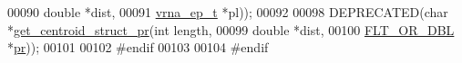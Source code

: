 \begin{DoxyCode}
00090                               \textcolor{keywordtype}{double} *dist,
00091                               \hyperlink{group__struct__utils_structvrna__elem__prob__s}{vrna\_ep\_t} *pl));
00092 
00098 DEPRECATED(\textcolor{keywordtype}{char}  *\hyperlink{centroid_8h_ac92486ce514677256f4a832dc518759c}{get\_centroid\_struct\_pr}(\textcolor{keywordtype}{int} length,
00099                               \textcolor{keywordtype}{double} *dist,
00100                               \hyperlink{group__data__structures_ga31125aeace516926bf7f251f759b6126}{FLT\_OR\_DBL} *\hyperlink{fold__vars_8h_ac98ec419070aee6831b44e5c700f090f}{pr}));
00101 
00102 \textcolor{preprocessor}{#endif}
00103 
00104 \textcolor{preprocessor}{#endif}
\end{DoxyCode}
